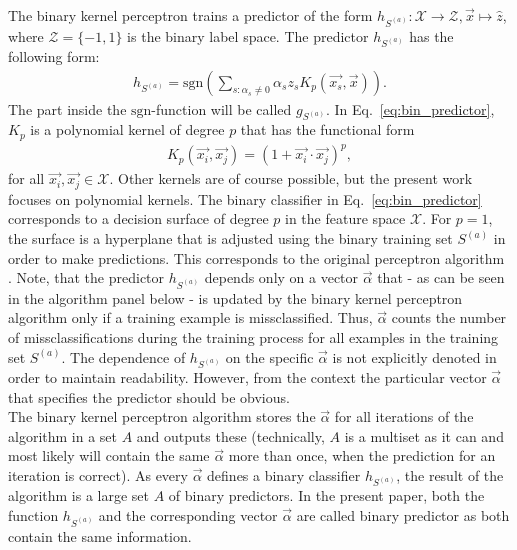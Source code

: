 The binary kernel perceptron trains a predictor of the form $h_{S^{(a)}}: \mathcal{X} \rightarrow \mathcal{Z}, \vec{x} \mapsto \hat{z}$, where $\mathcal{Z} = \{-1, 1\}$ is the binary label space. The predictor $h_{S^{(a)}}$ has the following form:
\begin{align}\label{eq:bin_predictor}
	h_{S^{(a)}} = \mathrm{sgn}\left( \sum_{s: \alpha_s \neq 0} \alpha_s z_s 	     	K_p(\vec{x_s}, \vec{x}) \right).
\end{align}
The part inside the $\mathrm{sgn}$-function will be called $g_{S^{(a)}}$. In Eq.~\ref{eq:bin_predictor}, $K_p$ is a polynomial kernel of degree $p$ that has the functional form
\begin{align*}
	K_p(\vec{x_i}, \vec{x_j}) = (1 + \vec{x_i} \cdot \vec{x_j})^p,
\end{align*}
for all $\vec{x_i}, \vec{x_j} \in \mathcal{X}$. Other kernels are of course possible, but the present work focuses on polynomial kernels. The binary classifier in Eq.~\ref{eq:bin_predictor} corresponds to a decision surface of degree $p$ in the feature space $\mathcal{X}$. For $p=1$, the surface is a hyperplane that is adjusted using the binary training set $S^{(a)}$ in order to make predictions. This corresponds to the original perceptron algorithm \cite{perceptron1957}. Note, that the predictor $h_{S^{(a)}}$ depends only on a vector $\vec{\alpha}$ that - as can be seen in the algorithm panel below - is updated by the binary kernel perceptron algorithm only if a training example is missclassified. Thus, $\vec{\alpha}$ counts the number of missclassifications during the training process for all examples in the training set $S^{(a)}$. The dependence of $h_{S^{(a)}}$ on the specific $\vec{\alpha}$ is not explicitly denoted in order to maintain readability. However, from the context the particular vector $\vec{\alpha}$ that specifies the predictor should be obvious.\\ 

The binary kernel perceptron algorithm stores the $\vec{\alpha}$ for all iterations of the algorithm in a set $A$ and outputs these (technically, $A$ is a multiset as it can and most likely will contain the same $\vec{\alpha}$ more than once, when the prediction for an iteration is correct). As every $\vec{\alpha}$ defines a binary classifier $h_{S^{(a)}}$, the result of the algorithm is a large set $A$ of binary predictors. In the present paper, both the function $h_{S^{(a)}}$ and the corresponding vector $\vec{\alpha}$ are called binary predictor as both contain the same information.\\

